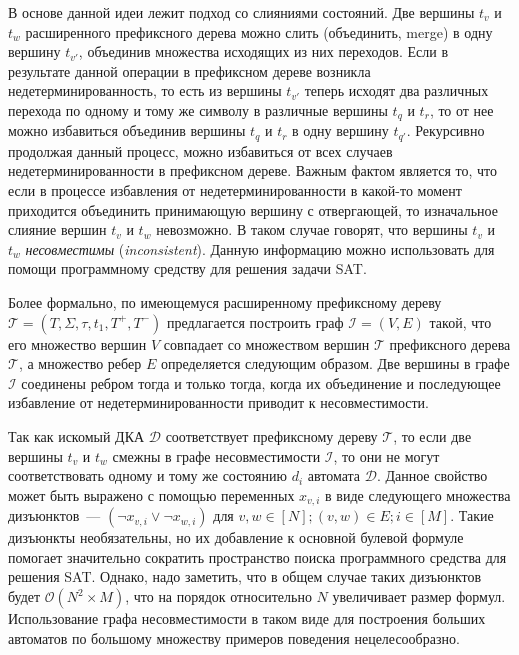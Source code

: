 В основе данной идеи лежит подход со слияниями состояний.
Две вершины $t_{v}$ и $t_{w}$ расширенного префиксного дерева можно слить (объединить, merge) в одну вершину $t_{v'}$, объединив множества исходящих из них переходов.
Если в результате данной операции в префиксном дереве возникла недетерминированность, то есть из вершины $t_{v'}$ теперь исходят два различных перехода по одному и тому же символу в различные вершины $t_{q}$ и $t_{r}$, то от нее можно избавиться объединив вершины $t_{q}$ и $t_{r}$ в одну вершину $t_{q'}$. 
Рекурсивно продолжая данный процесс, можно избавиться от всех случаев недетерминированности в префиксном дереве.
Важным фактом является то, что если в процессе избавления от недетерминированности в какой-то момент приходится объединить принимающую вершину с отвергающей, то изначальное слияние вершин $t_{v}$ и $t_{w}$ невозможно.
В таком случае говорят, что вершины $t_{v}$ и $t_{w}$ \emph{несовместимы} (\emph{inconsistent}).
Данную информацию можно использовать для помощи программному средству для решения задачи SAT.

Более формально, по имеющемуся расширенному префиксному дереву $\mathcal{T} = \left(T,\Sigma,\tau,t_{1},T^{+},T^{-}\right)$ предлагается построить граф $\mathcal{I} = \left(V, E\right)$ такой, что его множество вершин $V$ совпадает со множеством вершин $\mathcal{T}$ префиксного дерева $\mathcal{T}$, а множество ребер $E$ определяется следующим образом. 
Две вершины в графе $\mathcal{I}$ соединены ребром тогда и только тогда, когда их объединение и последующее избавление от недетерминированности приводит к несовместимости. 

Так как искомый ДКА $\mathcal{D}$ соответствует префиксному дереву $\mathcal{T}$, то если две вершины $t_{v}$ и $t_{w}$ смежны в графе несовместимости $\mathcal{I}$, то они не могут соответствовать одному и тому же состоянию $d_{i}$ автомата $\mathcal{D}$.
Данное свойство может быть выражено с помощью переменных $x_{v,i}$ в виде следующего множества дизъюнктов~{---} $\left(\neg x_{v,i} \vee \neg x_{w,i}\right)$ для $v,w \in \left[N\right]; \left(v,w\right) \in E; i \in \left[M\right]$.
Такие дизъюнкты необязательны, но их добавление к основной булевой формуле помогает значительно сократить пространство поиска программного средства для решения SAT. 
Однако, надо заметить, что в общем случае таких дизъюнктов будет $\mathcal{O}\left(N^{2} \times M\right)$, что на порядок относительно $N$ увеличивает размер формул. 
Использование графа несовместимости в таком виде для построения больших автоматов по большому множеству примеров поведения нецелесообразно. 

